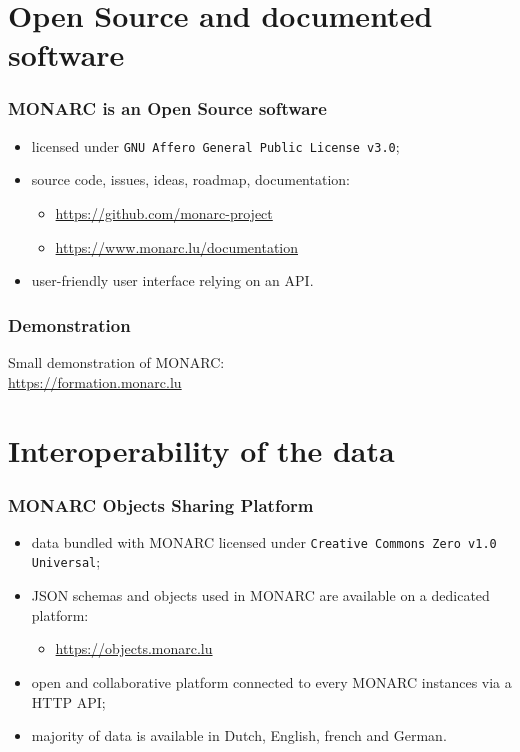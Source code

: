 \documentclass[]{beamer}
\begin{document}
\section{Open Source and documented software}
\begin{frame}
  \frametitle{MONARC is an Open Source software}
  \begin{center}
    \begin{itemize}
      \item licensed under \texttt{GNU Affero General Public License v3.0};
      \item source code, issues, ideas, roadmap, documentation:
        \begin{itemize}
            \item \url{https://github.com/monarc-project}
            \item \url{https://www.monarc.lu/documentation}
        \end{itemize}
      \item user-friendly user interface relying on an API.
    \end{itemize}
  \end{center}
\end{frame}

\begin{frame}
  \frametitle{Demonstration}
  Small demonstration of MONARC:\\
  \url{https://formation.monarc.lu}
\end{frame}


\section{Interoperability of the data}
\begin{frame}
  \frametitle{MONARC Objects Sharing Platform}
  \begin{center}
    \begin{itemize}
      \item data bundled with MONARC licensed under \texttt{Creative Commons Zero v1.0 Universal};
      \item JSON schemas and objects used in MONARC are available on a dedicated platform:\\
        \begin{itemize}
            \item \url{https://objects.monarc.lu}
        \end{itemize}
      \item open and collaborative platform connected to every MONARC instances via a HTTP API;
      \item majority of data is available in Dutch, English, french and German.
    \end{itemize}
  \end{center}
\end{frame}
\end{document}
